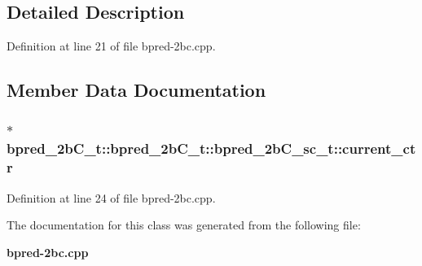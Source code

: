 \subsection{Detailed Description}


Definition at line 21 of file bpred-2bc.cpp.

\subsection{Member Data Documentation}
\subsubsection[{current\_\-ctr}]{$\ast$ bpred\_\-2bC\_\-t::bpred\_\-2bC\_\-t::bpred\_\-2bC\_\-sc\_\-t::current\_\-ctr}\label{classbpred__2bC__t_1_1bpred__2bC__sc__t_707891ebe3effe934fcb91785eb95ab1}




Definition at line 24 of file bpred-2bc.cpp.

The documentation for this class was generated from the following file:\begin{CompactItemize}
\item 
{\bf bpred-2bc.cpp}\end{CompactItemize}
